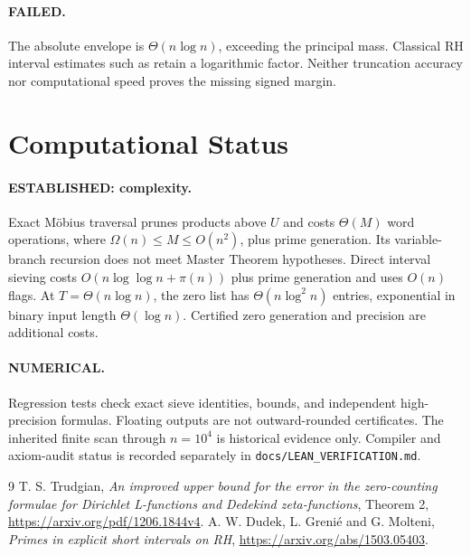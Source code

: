 \documentclass[11pt]{article}
\begin{document}
\paragraph{FAILED.}
The absolute envelope is $\Theta(n\log n)$, exceeding the principal mass.
Classical RH interval estimates such as \cite{dgm} retain a logarithmic
factor. Neither truncation accuracy nor computational speed proves the
missing signed margin.

\section{Computational Status}
\paragraph{ESTABLISHED: complexity.}
Exact M\"obius traversal prunes products above $U$ and costs $\Theta(M)$
word operations, where $\Omega(n)\le M\le O(n^2)$, plus prime generation.
Its variable-branch recursion does not meet Master Theorem hypotheses.
Direct interval sieving costs $O(n\log\log n+\pi(n))$ plus prime
generation and uses $O(n)$ flags. At $T=\Theta(n\log n)$, the zero list
has $\Theta(n\log^2n)$ entries, exponential in binary input length
$\Theta(\log n)$. Certified zero generation and precision are additional costs.
\paragraph{NUMERICAL.}
Regression tests check exact sieve identities, bounds, and independent
high-precision formulas. Floating outputs are not outward-rounded
certificates. The inherited finite scan through $n=10^4$ is historical
evidence only. Compiler and axiom-audit status is recorded separately in
\texttt{docs/LEAN\_VERIFICATION.md}.

\begin{thebibliography}{9}
 T. S. Trudgian,
\emph{An improved upper bound for the error in the zero-counting formulae
for Dirichlet L-functions and Dedekind zeta-functions}, Theorem 2,
\url{https://arxiv.org/pdf/1206.1844v4}.
 A. W. Dudek, L. Greni\'e and G. Molteni,
\emph{Primes in explicit short intervals on RH},
\url{https://arxiv.org/abs/1503.05403}.
\end{thebibliography}
\end{document}
